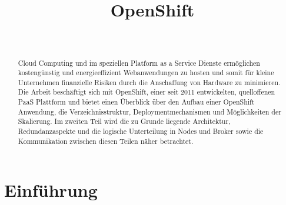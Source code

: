 \documentclass[10pt,a4paper,compsoc]{IEEEtran}
\begin{document}
\title{OpenShift}
\author{%
\\
%
}



\maketitle

\begin{abstract}
Cloud Computing und im speziellen Platform as a Service Dienste ermöglichen kostengünstig und energieeffizient Webanwendungen zu hosten und somit für kleine Unternehmen finanzielle Risiken durch die Anschaffung von Hardware zu minimieren. Die Arbeit beschäftigt sich mit OpenShift, einer seit 2011 entwickelten, quelloffenen PaaS Plattform und bietet einen Überblick über den Aufbau einer OpenShift Anwendung, die Verzeichnisstruktur, Deploymentmechanismen und Möglichkeiten der Skalierung. Im zweiten Teil wird die zu Grunde liegende Architektur, Redundanzaspekte und die logische Unterteilung in Nodes und Broker sowie die Kommunikation zwischen diesen Teilen näher betrachtet.
\end{abstract}

\section{Einführung}
\end{document}
